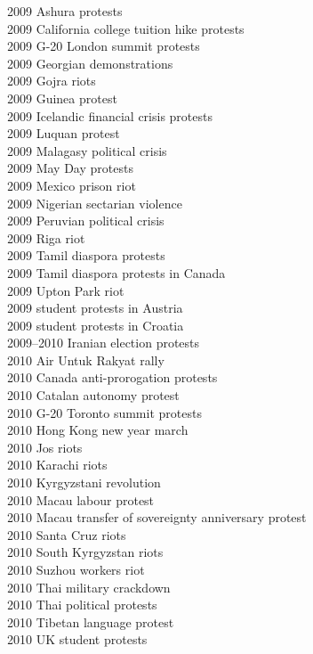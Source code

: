 2009 Ashura protests\\
2009 California college tuition hike protests\\
2009 G-20 London summit protests\\
2009 Georgian demonstrations\\
2009 Gojra riots\\
2009 Guinea protest\\
2009 Icelandic financial crisis protests\\
2009 Luquan protest\\
2009 Malagasy political crisis\\
2009 May Day protests\\
2009 Mexico prison riot\\
2009 Nigerian sectarian violence\\
2009 Peruvian political crisis\\
2009 Riga riot\\
2009 Tamil diaspora protests\\
2009 Tamil diaspora protests in Canada\\
2009 Upton Park riot\\
2009 student protests in Austria\\
2009 student protests in Croatia\\
2009–2010 Iranian election protests\\
2010 Air Untuk Rakyat rally\\
2010 Canada anti-prorogation protests\\
2010 Catalan autonomy protest\\
2010 G-20 Toronto summit protests\\
2010 Hong Kong new year march\\
2010 Jos riots\\
2010 Karachi riots\\
2010 Kyrgyzstani revolution\\
2010 Macau labour protest\\
2010 Macau transfer of sovereignty anniversary protest\\
2010 Santa Cruz riots\\
2010 South Kyrgyzstan riots\\
2010 Suzhou workers riot\\
2010 Thai military crackdown\\
2010 Thai political protests\\
2010 Tibetan language protest\\
2010 UK student protests\\

